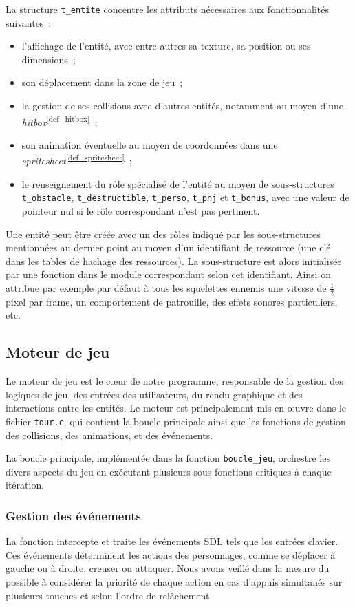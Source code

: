 \documentclass[a4paper,12pt]{article}
\newcommand\refsuscrite[1]{\textsuperscript{\ref{#1}}}
\begin{document}
La structure \texttt{t\_entite} concentre les attributs nécessaires aux fonctionnalités suivantes :
\begin{itemize}
	\item l’affichage de l’entité, avec entre autres sa texture, sa position ou ses dimensions ;
	\item son déplacement dans la zone de jeu ;
	\item la gestion de ses collisions avec d’autres entités, notamment au moyen d’une \textit{hitbox}\refsuscrite{def_hitbox} ;
	\item son animation éventuelle au moyen de coordonnées dans une \textit{spritesheet}\refsuscrite{def_spritesheet} ;
	\item le renseignement du rôle spécialisé de l’entité au moyen de sous-structures \texttt{t\_obstacle}, \texttt{t\_destructible}, \texttt{t\_perso}, \texttt{t\_pnj} et \texttt{t\_bonus}, avec une valeur de pointeur nul si le rôle correspondant n’est pas pertinent.
\end{itemize}
Une entité peut être créée avec un des rôles indiqué par les sous-structures mentionnées au dernier point au moyen d’un identifiant de ressource (une clé dans les tables de hachage des ressources). La sous-structure est alors initialisée par une fonction dans le module correspondant selon cet identifiant. Ainsi on attribue par exemple par défaut à tous les squelettes ennemis une vitesse de $\frac12$ pixel par frame, un comportement de patrouille, des effets sonores particuliers, etc.

\subsection{Moteur de jeu}
Le moteur de jeu est le cœur de notre programme, responsable de la gestion des logiques de jeu, des entrées des utilisateurs, du rendu graphique et des interactions entre les entités. Le moteur est principalement mis en œuvre dans le fichier \texttt{tour.c}, qui contient la boucle principale ainsi que les fonctions de gestion des collisions, des animations, et des événements.

La boucle principale, implémentée dans la fonction \texttt{boucle\_jeu}, orchestre les divers aspects du jeu en exécutant plusieurs sous-fonctions critiques à chaque itération.

\subsubsection{Gestion des événements}
La fonction intercepte et traite les événements SDL tels que les entrées clavier. Ces événements déterminent les actions des personnages, comme se déplacer à gauche ou à droite, creuser ou attaquer. Nous avons veillé dans la mesure du possible à considérer la priorité de chaque action en cas d’appuis simultanés sur plusieurs touches et selon l’ordre de relâchement.
    
\end{document}
